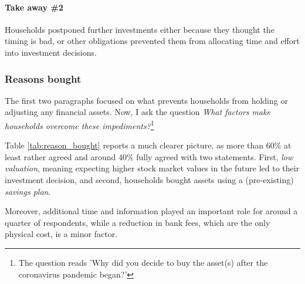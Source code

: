\documentclass[ProjectABM]{subfiles}
\begin{document}



\paragraph{Take away \#2}
Households postponed further investments either because they thought the timing is bad, or other obligations prevented them from allocating time and effort into investment decisions. %

\subsubsection{Reasons bought}
The first two paragraphs focused on what prevents households from holding or adjusting any financial assets. Now, I ask the question \textit{What factors make households overcome these impediments?}\footnote{The question reads 'Why did you decide to buy the asset(s) after the coronavirus pandemic began?'}



Table \ref{tab:reason_bought} reports a much clearer picture, as more than 60\% at least rather agreed and around 40\% fully agreed with two statements. First, \textit{low valuation}, meaning expecting higher stock market values in the future led to their investment decision, and second, households bought assets using a (pre-existing) \textit{savings plan}. %

Moreover, additional time and information played an important role for around a quarter of respondents, while a reduction in bank fees, which are the only physical cost, is a minor factor. %
\end{document}
